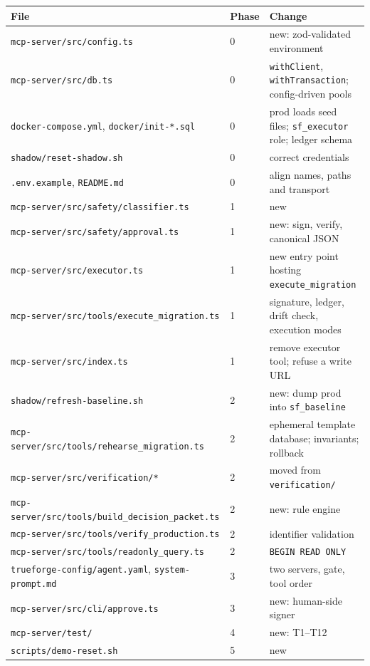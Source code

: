 \documentclass[11pt,a4paper]{article}
\newcommand{\fp}[1]{\nolinkurl{#1}}  %
\begin{document}
\begin{longtable}{@{}L{7.4cm}L{1.3cm}L{6.9cm}@{}}
\toprule
\sffamily\bfseries File & \sffamily\bfseries Phase & \sffamily\bfseries Change \\
\midrule
\endhead
\fp{mcp-server/src/config.ts} & 0 & new: zod-validated environment \\
\fp{mcp-server/src/db.ts} & 0 & \fp{withClient}, \fp{withTransaction}; config-driven pools \\
\fp{docker-compose.yml}, \fp{docker/init-*.sql} & 0 & prod loads seed files; \fp{sf_executor} role; ledger schema \\
\fp{shadow/reset-shadow.sh} & 0 & correct credentials \\
\fp{.env.example}, \fp{README.md} & 0 & align names, paths and transport \\
\fp{mcp-server/src/safety/classifier.ts} & 1 & new \\
\fp{mcp-server/src/safety/approval.ts} & 1 & new: sign, verify, canonical JSON \\
\fp{mcp-server/src/executor.ts} & 1 & new entry point hosting \fp{execute_migration} \\
\fp{mcp-server/src/tools/execute_migration.ts} & 1 & signature, ledger, drift check, execution modes \\
\fp{mcp-server/src/index.ts} & 1 & remove executor tool; refuse a write URL \\
\fp{shadow/refresh-baseline.sh} & 2 & new: dump prod into \fp{sf_baseline} \\
\fp{mcp-server/src/tools/rehearse_migration.ts} & 2 & ephemeral template database; invariants; rollback \\
\fp{mcp-server/src/verification/*} & 2 & moved from \fp{verification/} \\
\fp{mcp-server/src/tools/build_decision_packet.ts} & 2 & new: rule engine \\
\fp{mcp-server/src/tools/verify_production.ts} & 2 & identifier validation \\
\fp{mcp-server/src/tools/readonly_query.ts} & 2 & \texttt{BEGIN READ ONLY} \\
\fp{trueforge-config/agent.yaml}, \fp{system-prompt.md} & 3 & two servers, gate, tool order \\
\fp{mcp-server/src/cli/approve.ts} & 3 & new: human-side signer \\
\fp{mcp-server/test/} & 4 & new: T1--T12 \\
\fp{scripts/demo-reset.sh} & 5 & new \\
\bottomrule
\end{longtable}
\end{document}
